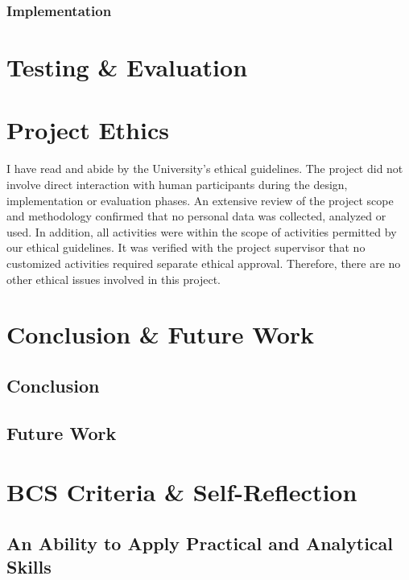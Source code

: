 \documentclass[12pt]{article}
\begin{document}
\subsubsection{Implementation}


\section{Testing \& Evaluation}

\section{Project Ethics}
I have read and abide by the University’s ethical guidelines\cite{UoL_COMP390_2023-24}. The project did not involve direct interaction with human
participants during the design, implementation or evaluation phases. An extensive review of the project scope and methodology
confirmed that no personal data was collected, analyzed or used. In addition, all activities were within the scope of activities
permitted by our ethical guidelines. It was verified with the project supervisor that no customized activities required separate
ethical approval. Therefore, there are no other ethical issues involved in this project.
\section{Conclusion \& Future Work}
\subsection{Conclusion}

\subsection{Future Work}

\section{BCS Criteria \& Self-Reflection}

\subsection{An Ability to Apply Practical and Analytical Skills}
\end{document}
